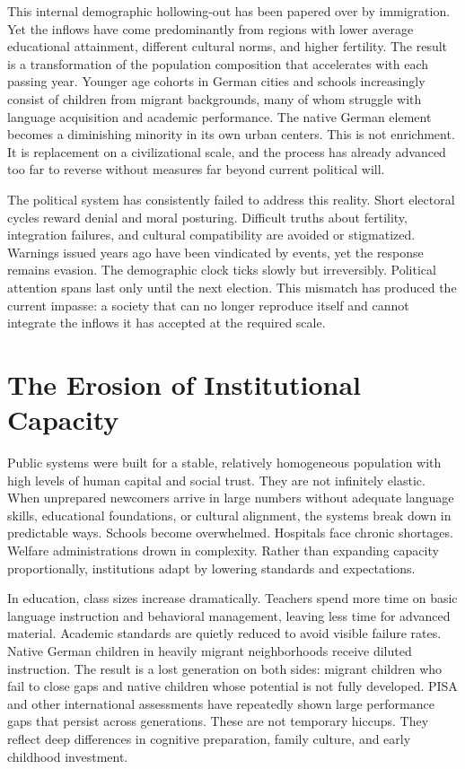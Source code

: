 ﻿\documentclass[12pt,a4paper]{book}
\begin{document}
This internal demographic hollowing-out has been papered over by immigration. Yet the inflows have come predominantly from regions with lower average educational attainment, different cultural norms, and higher fertility. The result is a transformation of the population composition that accelerates with each passing year. Younger age cohorts in German cities and schools increasingly consist of children from migrant backgrounds, many of whom struggle with language acquisition and academic performance. The native German element becomes a diminishing minority in its own urban centers. This is not enrichment. It is replacement on a civilizational scale, and the process has already advanced too far to reverse without measures far beyond current political will.

The political system has consistently failed to address this reality. Short electoral cycles reward denial and moral posturing. Difficult truths about fertility, integration failures, and cultural compatibility are avoided or stigmatized. Warnings issued years ago have been vindicated by events, yet the response remains evasion. The demographic clock ticks slowly but irreversibly. Political attention spans last only until the next election. This mismatch has produced the current impasse: a society that can no longer reproduce itself and cannot integrate the inflows it has accepted at the required scale.

\section{The Erosion of Institutional Capacity}

Public systems were built for a stable, relatively homogeneous population with high levels of human capital and social trust. They are not infinitely elastic. When unprepared newcomers arrive in large numbers without adequate language skills, educational foundations, or cultural alignment, the systems break down in predictable ways. Schools become overwhelmed. Hospitals face chronic shortages. Welfare administrations drown in complexity. Rather than expanding capacity proportionally, institutions adapt by lowering standards and expectations.

In education, class sizes increase dramatically. Teachers spend more time on basic language instruction and behavioral management, leaving less time for advanced material. Academic standards are quietly reduced to avoid visible failure rates. Native German children in heavily migrant neighborhoods receive diluted instruction. The result is a lost generation on both sides: migrant children who fail to close gaps and native children whose potential is not fully developed. PISA and other international assessments have repeatedly shown large performance gaps that persist across generations. These are not temporary hiccups. They reflect deep differences in cognitive preparation, family culture, and early childhood investment.
\end{document}
